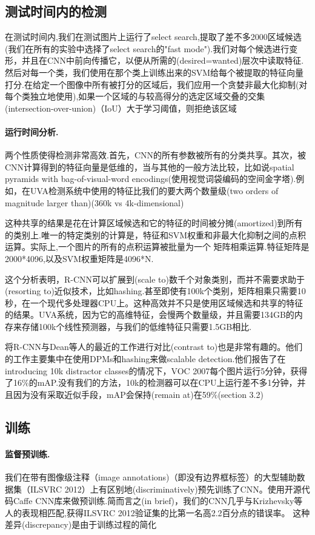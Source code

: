 \documentclass[a4paper,UTF8]{ctexart}
\theoremstyle{definition}
\begin{document}
\subsection{测试时间内的检测}
在测试时间内,我们在测试图片上运行了select search,提取了差不多2000区域候选(我们在所有的实验中选择了select search的"fast mode").我们对每个候选进行变形，并且在CNN中前向传播它，以便从所需的(desired=wanted)层次中读取特征.然后对每一个类，我们使用在那个类上训练出来的SVM给每个被提取的特征向量打分.在给定一个图像中所有被打分的区域后，我们应用一个贪婪非最大化抑制(对每个类独立地使用),如果一个区域的与较高得分的选定区域交叠的交集(intersection-over-union)（IoU）大于学习阈值，则拒绝该区域

\paragraph{运行时间分析.}两个性质使得检测非常高效.首先，CNN的所有参数被所有的分类共享。其次，被CNN计算得到的特征向量是低维的，当与其他的一般方法比较，比如说spatial pyramids with bag-of-visual-word encodings(使用视觉词袋编码的空间金字塔).例如，在UVA检测系统中使用的特征比我们的要大两个数量级(two orders of magnitude larger than)(360k vs 4k-dimensional)

这种共享的结果是花在计算区域候选和它的特征的时间被分摊(amortized)到所有的类别上.唯一的特定类别的计算是，特征和SVM权重和非最大化抑制之间的点积运算。实际上,一个图片的所有的点积运算被批量为一个 矩阵相乘运算.特征矩阵是2000*4096,以及SVM权重矩阵是4096*N.

这个分析表明，R-CNN可以扩展到(scale to)数千个对象类别，而并不需要求助于(resorting to)近似技术，比如hashing.甚至即使有100k个类别，矩阵相乘只需要10秒，在一个现代多处理器CPU上。这种高效并不只是使用区域候选和共享的特征的结果。UVA系统，因为它的高维特征，会慢两个数量级，并且需要134GB的内存来存储100k个线性预测器，与我们的低维特征只需要1.5GB相比.

将R-CNN与Dean等人的最近的工作进行对比(contrast to)也是非常有趣的。他们的工作主要集中在使用DPMs和hashing来做scalable detection.他们报告了在introducing 10k distractor classes的情况下，VOC 2007每个图片运行5分钟，获得了16\%的mAP.没有我们的方法，10k的检测器可以在CPU上运行差不多1分钟，并且因为没有采取近似手段，mAP会保持(remain at)在59\%(section 3.2)
\subsection{训练}
\paragraph{监督预训练.}我们在带有图像级注释（image annotations)（即没有边界框标签）的大型辅助数据集（ILSVRC 2012）上有区别地(discriminatively)预先训练了CNN。使用开源代码Caffe CNN库来做预训练.简而言之(in brief)，我们的CNN几乎与Krizhevsky等人的表现相匹配,获得ILSVRC 2012验证集的比第一名高2.2百分点的错误率。 这种差异(discrepancy)是由于训练过程的简化
\end{document}
